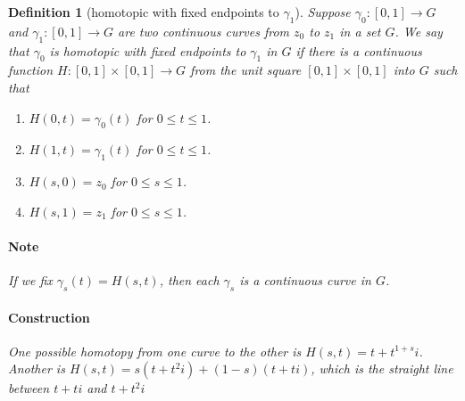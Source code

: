 \documentclass[a4paper]{article}
\newtheorem{definition}{Definition}
\begin{document}
\begin{definition}[homotopic with fixed endpoints to \(\gamma_1\)]
  Suppose \(\gamma_0 : [0, 1] \to G \) and \(\gamma_1 : [0, 1] \to G \) are two continuous curves from \(z_0\) to \(z_1\) in a set \(G\). 
  We say that \(\gamma_0\) is homotopic with fixed endpoints to \(\gamma_1\) in \(G\) if there is a continuous function \(H : [0, 1] \times [0, 1] \to G\) from the unit square \([0, 1] \times [0, 1]\) into \(G\) such that 
  \begin{enumerate}
    \item \(H(0, t) = \gamma_0(t)\)  for \(0 \leq t \leq 1\). 
    \item \(H(1, t) = \gamma_1(t)\)  for \(0 \leq t \leq 1\). 
    \item \(H(s, 0) = z_0\) for \(0 \leq s \leq 1\). 
    \item \(H(s, 1) = z_1\)  for \(0 \leq s \leq 1\). 
  \end{enumerate}

  \paragraph{Note}
  If we fix \(\gamma_s(t) = H(s, t)\), then each \(\gamma_s\) is a continuous curve in \(G\). 

  \paragraph{Construction}
  One possible homotopy from one curve to the other is \(H(s, t) = t + t^{1 + s} i\).
   Another is \(H(s, t) = s(t + t^2 i) + (1 - s)(t + ti)\), which is the straight line between \(t + ti\) and \(t + t^2 i\)
\end{definition}
\end{document}

